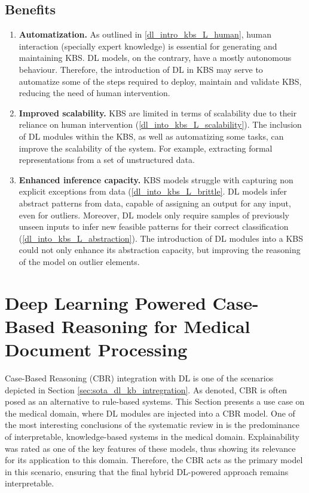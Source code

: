 \subsection{Benefits}
\begin{enumerate} [start=1,label={\bfseries B\arabic*.}]
    \item \textbf{Automatization.}\label{dlintrokbs_B_automatization} As outlined in \ref{dl_intro_kbs_L_human}, human interaction (specially expert knowledge) is essential for generating and maintaining KBS. DL models, on the contrary, have a mostly autonomous behaviour. Therefore, the introduction of DL in KBS may serve to automatize some of the steps required to deploy, maintain and validate KBS, reducing the need of human intervention.
    
    \item \textbf{Improved scalability.}\label{dlintrokbs_B_scalability} KBS are limited in terms of scalability due to their reliance on human intervention (\ref{dl_into_kbs_L_scalability}). The inclusion of DL modules within the KBS, as well as automatizing some tasks, can improve the scalability of the system. For example, extracting formal representations from a set of unstructured data.
    
    \item \textbf{Enhanced inference capacity.}\label{dlintrokbs_B_inference} KBS models struggle with capturing non explicit exceptions from data (\ref{dl_into_kbs_L_brittle}. DL models infer abstract patterns from data, capable of assigning an output for any input, even for outliers. Moreover, DL models only require samples of previously unseen inputs to infer new feasible patterns for their correct classification (\ref{dl_into_kbs_L_abstraction}). The introduction of DL modules into a KBS could not only enhance its abstraction capacity, but improving the reasoning of the model on outlier elements.

\end{enumerate}


\section{Deep Learning Powered Case-Based Reasoning for Medical Document Processing}\label{5_sec:dl_powered_kbs_medical}
Case-Based Reasoning (CBR) integration with DL is one of the scenarios depicted in Section \ref{sec:sota_dl_kb_intregration}. As denoted, CBR is often posed as an alternative to rule-based systems. This Section presents a use case on the medical domain, where DL modules are injected into a CBR model. One of the most interesting conclusions of the systematic review in \cite{amador_systematic_review_2019} is the predominance of interpretable, knowledge-based systems in the medical domain. Explainability was rated as one of the key features of these models, thus showing its relevance for its application to this domain. Therefore, the CBR acts as the primary model in this scenario, ensuring that the final hybrid DL-powered approach remains interpretable. 


